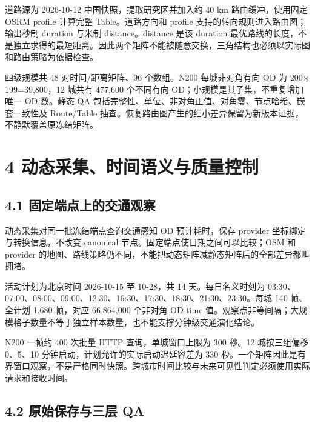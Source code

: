 \documentclass[UTF8,10pt,a4paper,fontset=fandol]{ctexart}
\begin{document}
道路源为 2026-10-12 中国快照，提取研究区并加入约 40 km 路由缓冲，使用固定 OSRM profile 计算完整 Table。道路方向和 profile 支持的转向规则进入路由图；输出秒制 duration 与米制 distance。distance 是该 duration 最优路线的长度，不是独立求得的最短距离。因此两个矩阵不能被随意交换，三角结构也必须以实际图和路由策略为依据检查。


四级规模共 48 对时间/\allowbreak{}距离矩阵、96 个数组。N200 每城非对角有向 OD 为 200\ensuremath{\times}199=39,800，12 城共有 477,600 个不同有向 OD；小规模是其子集，不重复增加唯一 OD 数。静态 QA 包括完整性、单位、非对角正值、对角零、节点哈希、嵌套一致性及 Route/\allowbreak{}Table 抽查。恢复路由图产生的细小差异保留为新版本证据，不静默覆盖原冻结矩阵。


\section*{4 动态采集、时间语义与质量控制}


\subsection*{4.1 固定端点上的交通观察}


动态采集对同一批冻结端点查询交通感知 OD 预计耗时，保存 provider 坐标绑定与转换信息，不改变 canonical 节点。固定端点使日期之间可以比较；OSM 和 provider 的地图、路线策略仍不同，不能把动态矩阵减静态矩阵后的全部差异都叫拥堵。


活动计划为北京时间 2026-10-15 至 10-28，共 14 天。每日名义时刻为 03:30、07:00、08:00、09:00、12:30、16:30、17:30、18:30、21:30、23:30。每城 140 帧、全计划 1,680 帧，对应 66,864,000 个非对角 OD-time 值。观察点非等间隔；大规模格子数量不等于独立样本数量，也不能支撑分钟级交通演化结论。


N200 一帧约 400 次批量 HTTP 查询，单城窗口上限为 300 秒。12 城按三组偏移 0、5、10 分钟启动，计划允许的实际启动迟延容差为 330 秒。一个矩阵因此是有界窗口观察，不是严格同时快照。跨城市时间比较与未来可见性判定必须使用实际请求和接收时间。


\subsection*{4.2 原始保存与三层 QA}

\end{document}
